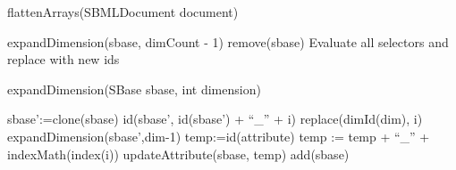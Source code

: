 %
%

\begin{algorithm}[ht]
  \caption{flattenArrays(SBMLDocument document)}
{
        expandDimension(sbase, dimCount - 1)\;
        remove(sbase)\;
}
Evaluate all selectors and replace with new ids\;
\end{algorithm}

\begin{algorithm}[ht]
  \caption{expandDimension(SBase sbase, int dimension)}
{
       {
                {
                        sbase':=clone(sbase)\;
                        id(sbase', id(sbase') + ``\_'' + i)\;
                        replace(dimId(dim), i)\;
                        expandDimension(sbase',dim-1)\;
               }
     }
     \Else
     {
                {
                  temp:=id(attribute)\;
                        {
                          temp := temp + ``\_'' + indexMath(index(i))\;
                        }
                   updateAttribute(sbase, temp)\;
                   add(sbase)\;
                }
     }
}
\end{algorithm}